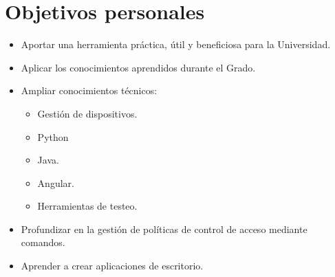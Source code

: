 \section{Objetivos personales}\label{sec:objetivos-personales}
    \begin{itemize}
        \item Aportar una herramienta práctica, útil y beneficiosa para la Universidad.
        \item Aplicar los conocimientos aprendidos durante el Grado.
        \item Ampliar conocimientos técnicos:
        \begin{itemize}
                  \item Gestión de dispositivos.
                  \item Python
                  \item Java.
                  \item Angular.
                  \item Herramientas de testeo.
        \end{itemize}
        \item Profundizar en la gestión de políticas de control de acceso mediante comandos.
        \item Aprender a crear aplicaciones de escritorio.
    \end{itemize}